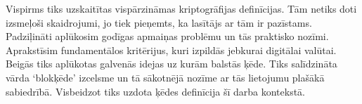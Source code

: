 Vispirms tiks uzskaitītas vispārzināmas kriptogrāfijas definīcijas. Tām netiks doti izsmeļoši skaidrojumi, jo tiek pieņemts, ka lasītājs ar tām ir pazīstams. Padziļināti aplūkosim godīgas apmaiņas problēmu un tās praktisko nozīmi. Aprakstīsim fundamentālos kritērijus, kuri izpildās jebkurai digitālai valūtai. Beigās tiks aplūkotas galvenās idejas uz kurām balstās ķēde. Tiks salīdzināta vārda `blokķēde' izcelsme un tā sākotnējā nozīme ar tās lietojumu plašākā sabiedrībā. Visbeidzot tiks uzdota ķēdes definīcija šī darba kontekstā.
